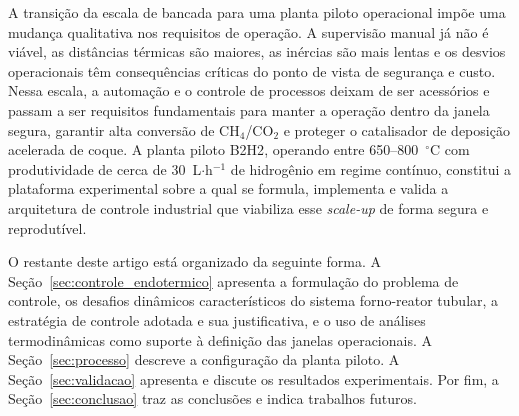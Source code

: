 A transição da escala de bancada para uma planta piloto operacional impõe uma
mudança qualitativa nos requisitos de operação. A supervisão manual já não é
viável, as distâncias térmicas são maiores, as inércias são mais lentas e os
desvios operacionais têm consequências críticas do ponto de vista de segurança
e custo. Nessa escala, a automação e o controle de processos deixam de ser
acessórios e passam a ser requisitos fundamentais para manter a operação dentro
da janela segura, garantir alta conversão de CH\(_4\)/CO\(_2\) e proteger o
catalisador de deposição acelerada de coque. A planta piloto B2H2\citep{oliveira2025a,ferreira2025b},
operando entre 650--800~\(^\circ\)C com produtividade de cerca de
30~L\(\cdot\)h\(^{-1}\) de hidrogênio em regime contínuo, constitui a plataforma
experimental sobre a qual se formula, implementa e valida a arquitetura de
controle industrial que viabiliza esse \emph{scale-up} de forma segura e
reprodutível.

O restante deste artigo está organizado da seguinte forma. A
Seção~\ref{sec:controle_endotermico} apresenta a formulação do problema de
controle, os desafios dinâmicos característicos do sistema forno-reator
tubular, a estratégia de controle adotada e sua justificativa, e o uso de
análises termodinâmicas como suporte à definição das janelas operacionais. A
Seção~\ref{sec:processo} descreve a configuração da planta piloto. A
Seção~\ref{sec:validacao} apresenta e discute os resultados experimentais.
Por fim, a Seção~\ref{sec:conclusao} traz as conclusões e indica trabalhos
futuros.
